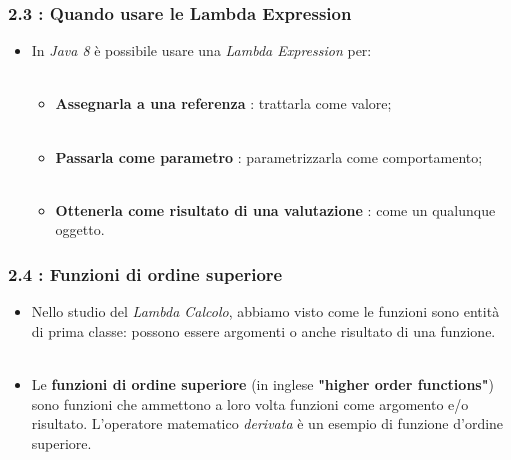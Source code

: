 \documentclass{beamer}
\begin{document}
\begin{frame}
	\frametitle{\textbf{2.3 : Quando usare le Lambda Expression}}
	\begin{itemize}
		\item
			In \textit{Java 8} \`e possibile usare una \textit{Lambda Expression} per:\\\
		\begin{itemize}
			\item
				\textbf{Assegnarla a una referenza} : trattarla come valore;\\\
			\item
				\textbf{Passarla come parametro} : parametrizzarla come comportamento;\\\
			\item
				\textbf{Ottenerla come risultato di una valutazione} : come un qualunque oggetto.
		\end{itemize}
	\end{itemize}
\end{frame}


\begin{frame}
	\frametitle{\textbf{2.4 : Funzioni di ordine superiore}}
	\begin{itemize}
		\item
			Nello studio del \textit{Lambda Calcolo}, abbiamo visto come le funzioni sono entità di prima classe: possono essere argomenti o anche risultato di una funzione.\\\
		\item
			Le \textbf{funzioni di ordine superiore} (in inglese \textbf{"higher order functions"}) sono funzioni che ammettono a loro volta funzioni come argomento e/o risultato. L'operatore matematico \emph{derivata} \`e un esempio di funzione d'ordine superiore.
	\end{itemize}
\end{frame}


\end{document}
